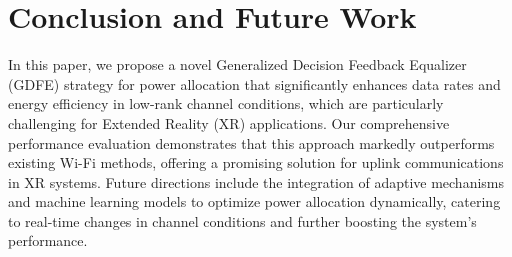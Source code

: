 \section{Conclusion and Future Work}

In this paper, we propose a novel Generalized Decision Feedback Equalizer (GDFE) strategy for power allocation that significantly enhances data rates and energy efficiency in low-rank channel conditions, which are particularly challenging for Extended Reality (XR) applications. Our comprehensive performance evaluation demonstrates that this approach markedly outperforms existing Wi-Fi methods, offering a promising solution for uplink communications in XR systems. Future directions include the integration of adaptive mechanisms and machine learning models to optimize power allocation dynamically, catering to real-time changes in channel conditions and further boosting the system's performance.